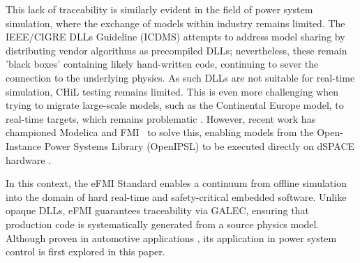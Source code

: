 This lack of traceability is similarly evident in the field of power system simulation, where the exchange of models within industry remains limited. The IEEE/CIGRE DLLs Guideline (ICDMS) \cite{CIGRE958} attempts to address model sharing by distributing vendor algorithms as precompiled DLLs; nevertheless, these remain 'black boxes' containing likely hand-written code, continuing to sever the connection to the underlying physics. As such DLLs are not suitable for real-time simulation, CHiL testing remains limited. This is even more challenging when trying to migrate large-scale models, such as the Continental Europe model, to real-time targets, which remains problematic \cite{Ramirez2024}. However, recent work has championed Modelica and FMI~\cite{FMIv2:0:2} to solve this, enabling models from the Open-Instance Power Systems Library (OpenIPSL) to be executed directly on dSPACE hardware \cite{deCastro2023_RealTime}.

In this context, the eFMI Standard \cite{eFMI_Standard, Lenord2021} enables a continuum from offline simulation into the domain of hard real-time and safety-critical embedded software. Unlike opaque DLLs, eFMI guarantees traceability via GALEC, ensuring that production code is systematically generated from a source physics model. Although proven in automotive applications \cite{Ultsch2021, Kamp2025, Armugham2021}, its application in power system control is first explored in this paper.
